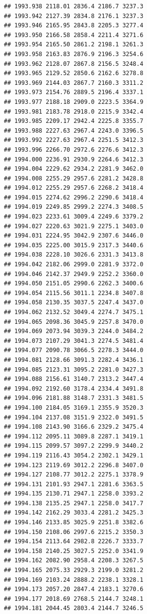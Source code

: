 \documentclass[
]{book}
\begin{document}
\begin{verbatim}
## 1993.938 2118.01 2836.4 2186.7 3237.3
## 1993.942 2127.39 2834.8 2176.1 3237.3
## 1993.946 2165.95 2843.8 2205.3 3277.4
## 1993.950 2166.58 2858.4 2211.4 3271.6
## 1993.954 2165.50 2861.2 2198.1 3261.3
## 1993.958 2163.83 2876.9 2196.3 3254.6
## 1993.962 2128.07 2867.8 2156.5 3248.4
## 1993.965 2129.52 2850.6 2162.6 3278.8
## 1993.969 2144.03 2867.7 2160.3 3311.2
## 1993.973 2154.76 2889.5 2196.4 3337.1
## 1993.977 2188.18 2909.0 2223.5 3364.9
## 1993.981 2183.78 2918.0 2215.9 3342.4
## 1993.985 2209.17 2942.4 2225.8 3355.7
## 1993.988 2227.63 2967.4 2243.0 3396.5
## 1993.992 2227.63 2967.4 2251.5 3412.3
## 1993.996 2266.70 2972.6 2276.6 3412.3
## 1994.000 2236.91 2930.9 2264.6 3412.3
## 1994.004 2229.62 2934.2 2281.9 3462.0
## 1994.008 2255.29 2957.6 2281.2 3428.8
## 1994.012 2255.29 2957.6 2268.2 3418.4
## 1994.015 2274.62 2996.2 2290.6 3418.4
## 1994.019 2249.85 2999.2 2274.3 3408.5
## 1994.023 2233.61 3009.4 2249.6 3379.2
## 1994.027 2220.63 3021.9 2275.1 3403.0
## 1994.031 2224.95 3042.9 2307.6 3446.0
## 1994.035 2225.00 3015.9 2317.3 3440.6
## 1994.038 2228.10 3026.6 2331.3 3413.8
## 1994.042 2182.06 2999.0 2281.9 3372.0
## 1994.046 2142.37 2949.9 2252.2 3360.0
## 1994.050 2151.05 2990.6 2262.3 3400.6
## 1994.054 2115.56 3011.1 2234.8 3407.8
## 1994.058 2130.35 3037.5 2247.4 3437.0
## 1994.062 2132.52 3049.4 2274.7 3475.1
## 1994.065 2098.36 3045.9 2257.8 3470.0
## 1994.069 2073.94 3039.3 2244.0 3484.2
## 1994.073 2107.29 3041.3 2274.5 3481.4
## 1994.077 2090.78 3066.5 2278.3 3444.0
## 1994.081 2128.66 3091.3 2282.4 3436.1
## 1994.085 2123.31 3095.2 2281.0 3427.3
## 1994.088 2156.61 3140.7 2313.2 3447.4
## 1994.092 2192.60 3178.4 2334.4 3491.8
## 1994.096 2181.88 3148.7 2331.3 3481.5
## 1994.100 2184.05 3169.1 2355.9 3520.3
## 1994.104 2137.08 3151.9 2322.0 3491.5
## 1994.108 2143.90 3166.6 2329.2 3475.4
## 1994.112 2095.11 3089.8 2287.1 3419.1
## 1994.115 2099.57 3097.2 2299.9 3440.2
## 1994.119 2116.43 3054.2 2302.1 3429.1
## 1994.123 2119.69 3012.2 2296.8 3407.0
## 1994.127 2108.77 3012.2 2275.1 3378.9
## 1994.131 2101.93 2947.1 2281.6 3363.5
## 1994.135 2130.71 2947.1 2258.0 3393.2
## 1994.138 2135.25 2947.1 2258.0 3417.7
## 1994.142 2162.29 3033.4 2281.2 3425.3
## 1994.146 2133.85 3025.9 2251.8 3382.6
## 1994.150 2108.06 2997.6 2215.2 3350.3
## 1994.154 2113.64 2982.8 2226.7 3333.7
## 1994.158 2140.25 3027.5 2252.0 3341.9
## 1994.162 2082.90 2958.4 2208.3 3267.5
## 1994.165 2075.33 2929.3 2199.0 3281.2
## 1994.169 2103.24 2888.2 2238.1 3328.1
## 1994.173 2057.20 2847.4 2183.1 3270.6
## 1994.177 2018.69 2768.5 2144.7 3248.1
## 1994.181 2044.45 2803.4 2144.7 3246.5

\end{verbatim}
\end{document}
